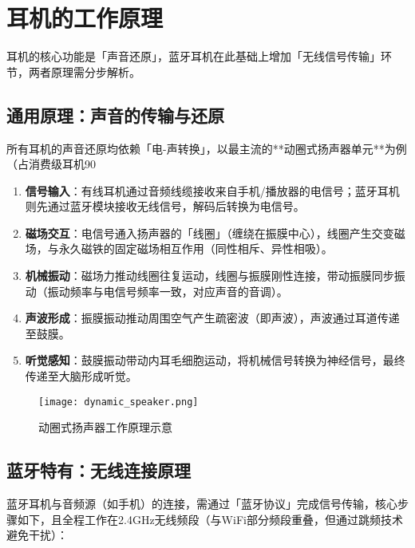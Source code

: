 \documentclass[UTF8]{ctexart}
\begin{document}
\section{耳机的工作原理}
耳机的核心功能是「声音还原」，蓝牙耳机在此基础上增加「无线信号传输」环节，两者原理需分步解析。

\subsection{通用原理：声音的传输与还原}
所有耳机的声音还原均依赖「电-声转换」，以最主流的**动圈式扬声器单元**为例（占消费级耳机90%

\begin{enumerate}[label={\arabic*.}, itemsep=6pt]
    \item \textbf{信号输入}：有线耳机通过音频线缆接收来自手机/播放器的电信号；蓝牙耳机则先通过蓝牙模块接收无线信号，解码后转换为电信号。
    \item \textbf{磁场交互}：电信号通入扬声器的「线圈」（缠绕在振膜中心），线圈产生交变磁场，与永久磁铁的固定磁场相互作用（同性相斥、异性相吸）。
    \item \textbf{机械振动}：磁场力推动线圈往复运动，线圈与振膜刚性连接，带动振膜同步振动（振动频率与电信号频率一致，对应声音的音调）。
    \item \textbf{声波形成}：振膜振动推动周围空气产生疏密波（即声波），声波通过耳道传递至鼓膜。
    \item \textbf{听觉感知}：鼓膜振动带动内耳毛细胞运动，将机械信号转换为神经信号，最终传递至大脑形成听觉。
\end{enumerate}

\begin{figure}[htbp]
    \centering
    \texttt{[image: dynamic\_speaker.png]}  %
    \caption{动圈式扬声器工作原理示意}
    \label{fig:dynamic_principle}
\end{figure}

\subsection{蓝牙特有：无线连接原理}
蓝牙耳机与音频源（如手机）的连接，需通过「蓝牙协议」完成信号传输，核心步骤如下，且全程工作在2.4GHz无线频段（与WiFi部分频段重叠，但通过跳频技术避免干扰）：
\end{document}

